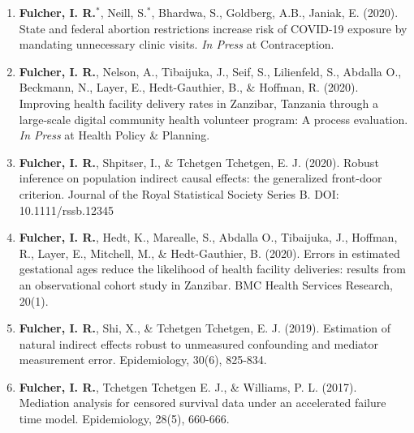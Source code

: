 \documentclass[12pt]{article}
\begin{document}
\begin{enumerate}

\setcounter{enumi}{0}
	
	
	
	
	
	\item \textbf{Fulcher, I. R.}$^{*}$, Neill, S.$^{*}$, Bhardwa, S., Goldberg, A.B., Janiak, E. (2020). State and federal abortion restrictions increase risk of COVID-19 exposure by mandating unnecessary clinic visits. \textit{In Press} at Contraception. 
	
	\item \textbf{Fulcher, I. R.}, Nelson, A., Tibaijuka, J., Seif, S., Lilienfeld, S., Abdalla O., Beckmann, N., Layer, E., Hedt-Gauthier, B., \& Hoffman, R. (2020). Improving health facility delivery rates in Zanzibar, Tanzania through a large-scale digital community health volunteer program: A process evaluation. \textit{In Press} at Health Policy \& Planning. 
	
	\item \textbf{Fulcher, I. R.}, Shpitser, I., \& Tchetgen Tchetgen, E. J. (2020). Robust inference on population indirect causal effects: the generalized front-door criterion. Journal of the Royal Statistical Society Series B. DOI: 10.1111/rssb.12345
	
	\item \textbf{Fulcher, I. R.}, Hedt, K., Marealle, S., Abdalla O., Tibaijuka, J., Hoffman, R., Layer, E., Mitchell, M., \& Hedt-Gauthier, B. (2020). Errors in estimated gestational ages reduce the likelihood of health facility deliveries: results from an observational cohort study in Zanzibar. BMC Health Services Research, 20(1).

	\item \textbf{Fulcher, I. R.}, Shi, X., \& Tchetgen Tchetgen, E. J. (2019). Estimation of natural indirect effects robust to unmeasured confounding and mediator measurement error. Epidemiology, 30(6), 825-834.
	
	\item \textbf{Fulcher, I. R.}, Tchetgen Tchetgen E. J., \& Williams, P. L. (2017). Mediation analysis for censored survival data under an accelerated failure time model.  Epidemiology, 28(5), 660-666. 
	
\end{enumerate}
\end{document}

